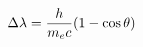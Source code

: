 \documentclass[preview]{standalone}
\begin{document}
\begin{align*}
\special{dvisvgm:raw <g id='unique000'>}\Delta \lambda = \frac{h}{m_e c}(1 - \cos\theta)\special{dvisvgm:raw </g>}
\end{align*}
\end{document}

